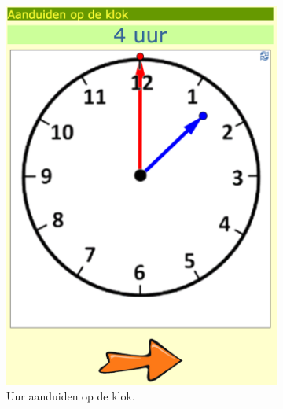 \documentclass[a4paper,11pt]{article}
\theoremstyle{definition}
\begin{document}
\begin{figure}[h!]
        \centering
        \begin{subfigure}{.5\textwidth}
          \centering
                \includegraphics[scale=0.15]{klok1.jpg}
                \caption{Uur aanduiden op de klok.}
                \label{klok1}
        \end{subfigure}%
        \begin{subfigure}{.5\textwidth}
           \centering

\end{subfigure}
\end{figure}
\end{document}
